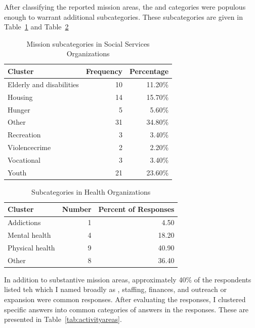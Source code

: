 After classifying the reported mission areas, the  and  categories were populous enough to warrant additional subcategories. These subcategories are given in Table~\ref{tab:socmissions} and Table~\ref{tab:healthareas}

\begin{table}[ht]
\centering
 \begin{tabular}{lrr}
   \hline
  Cluster & Frequency & Percentage \\
   \hline
 Elderly and disabilities &  10 & 11.20\% \\
   Housing &  14 & 15.70\% \\
   Hunger &   5 & 5.60\% \\
   Other &  31 & 34.80\% \\
  Recreation &   3 & 3.40\% \\
    Violence\/crime &   2 & 2.20\% \\
 Vocational &   3 & 3.40\% \\
   Youth &  21 & 23.60\% \\
    \hline
 \end{tabular}
 \caption{Mission subcategories in Social Services Organizations}
 \label{tab:socmissions}
 \end{table}
 
  \begin{table}[ht]
 \centering
 \begin{tabular}{lrr}
   \hline
  Cluster & Number & Percent of Responses \\
   \hline
 Addictions &   1 & 4.50 \\
 Mental health &   4 & 18.20 \\
 Physical health &   9 & 40.90 \\
  Other &   8 & 36.40 \\
    \hline
 \end{tabular}
 \caption{Subcategories in Health Organizations}
 \label{tab:healthareas}
 \end{table}
 
In addition to substantive mission areas, approximately 40\% of the respondents listed teh  which I named broadly as , staffing, finances, and outreach or expansion were common responses. After evaluating the responses, I clustered specific answers into common categories of answers in the responses. These are presented in Table~\ref{tab:activityareas}.

